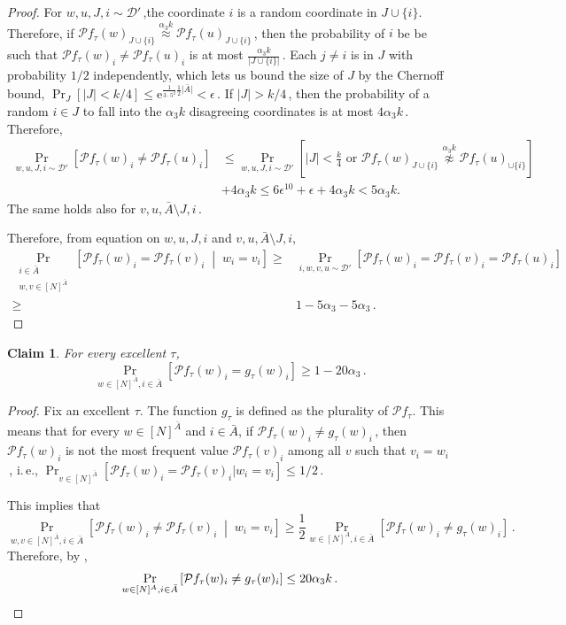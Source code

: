 \documentclass[11pt]{article}
\numberwithin{equation}{section}
\newtheorem{claim}[theorem]{Claim}
\theoremstyle{definition}
\theoremstyle{plain}
\newcommand{\eee}{\mathrm e}
\newcommand{\ie}{i.\,e.}
\newcommand{\Prob}[2][]{\Pr_{{#1}}\left[#2\right]} %
\newcommand{\brac}[1]{[#1]} %
\newcommand{\abs}[1]{\lvert#1\rvert} %
\newcommand{\given}{\;\middle\vert\;} %
\newcommand{\set}[1]{\{#1\}} %
\newcommand\f{f} %
\newcommand{\g}{g} %
\newcommand\bh{\mathcal{P}\f_\tau} %
\newcommand\neql[1]{\stackrel{{#1}}{ \approx}} %
\newcommand\neqg[1]{\stackrel{{#1}}{ \not\approx}} %
\newcommand\rest[1]{{\bar{#1}}}  %
\begin{document}
\begin{proof}
	For $w,u,J,i\sim\mathcal{D}'$\,,the coordinate $i$ is a random coordinate in $J\cup \set{i}$. Therefore, if $\bh(w)_{J\cup\set{i}} \neql{\alpha_3 k} \bh(u)_{J\cup\set{i}}$\,, then the probability of $i$ be be such that $\bh(w)_{i} \neq \bh(u)_{i}$ is at most $\frac{\alpha_3 k}{\abs{J\cup\set{i}}}$\,. 
	Each $j\neq i$ is in $J$ with probability 
	$1/2$ %
	independently, which lets us bound the size of $J$ by
the  %
Chernoff bound, $\Pr_J[\abs{J}<
	 k/4 %
	 ]\leq \eee^{\frac{1}{3\cdot 5^2}\frac{1}{2}\abs{\rest{A}}}< \epsilon$\,. If $\abs{J}>
	 k/4$\,, %
	then the probability of a random $i\in J$ to fall into the $\alpha_3 k$ disagreeing coordinates is at most $4\alpha_3 k$\,.
	Therefore,
	\begin{align}
	\Prob[w,u,J,i\sim\mathcal{D}']{\bh(w)_{i} \neq\bh(u)_{i}} &\leq \Prob[w,u,J,i\sim\mathcal{D}']{\abs{J}<\frac{k}{4} \textrm{ or }\bh(w)_{J\cup\set{i}} \neqg{\alpha_3 k} \bh(u)_{\cup\set{i}}} \nonumber\\
	&+ 4\alpha_3 k  \leq 6\epsilon^{10}+\epsilon+4\alpha_3 k < 5\alpha_3 k.\label{eq:i from J}
	\end{align}
	The same holds also for $v,u,\rest{A}\setminus J,i$\,.
	
	Therefore, from equation  on  $w,u,J,i$ and $v,u,\rest{A}\setminus J,i$,
	\begin{align*}
	\Prob[\substack{i\in\rest{A}\\w,v\in\brac{N}^{\rest{A}}}]{\bh(w)_i=\bh(v)_i\given w_i=v_i} \geq&  \Prob[i,w,v,u\sim\mathcal{D}']{\bh(w)_i=\bh(v)_i = \bh(u)_i} \\
	\geq& 1- 5\alpha_3 - 5\alpha_3\,.%
	\end{align*}
\end{proof}


\begin{claim} \label{claim:local avg product i}
	For every excellent $\tau$,
	\[ \Prob[w\in\brac{N}^{\bar{A}},i\in{\bar{A}}]{ \bh(w)_i = \g_\tau(w)_i}\geq 1-20\alpha_3\,.\]
\end{claim}

\begin{proof}
	Fix an excellent $\tau$. The function $\g_\tau$ is defined as the plurality of $\bh$. This means that for every $w\in[N]^{\rest{A}}$ and $i\in\rest{A}$, if $\bh(w)_i \neq \g_\tau(w)_i$\,, then $\bh(w)_i$ is not the most frequent value $\bh(v)_i$ among all $v $ such that $v_i=w_i$\,, \ie,
	 $\Pr_{v\in[N]^{\bar{A}}}[\bh(w)_i = \bh(v)_i | w_i=v_i]\leq 
	1/2$\,. %
	
	This implies that
	\[ \Prob[w,v\in\brac{N}^{\bar{A}},i\in\bar{A}]{\bh(w)_i \neq \bh(v)_i \given w_i=v_i} \geq \frac{1}{2}\Prob[w\in\brac{N}^{A},i\in\bar{A}]{ \bh(w)_i \neq \g_\tau(w)_i}\,.\,\]%
	Therefore, by , 
	\[\Prob[w\in\brac{N}^{A},i\in\bar{A}]{ \bh(w)_i \neq \g_\tau(w)_i}\leq 20\alpha_3 k\,. \qedhere \]  %
\end{proof}
\end{document}

